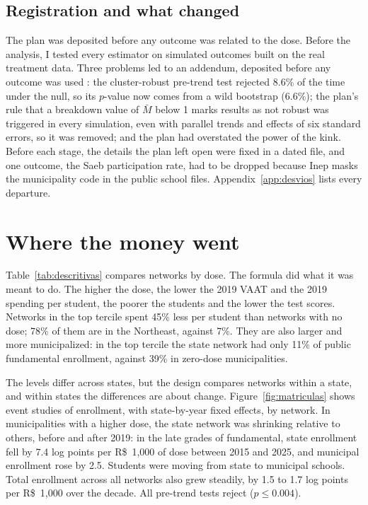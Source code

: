 \documentclass[11pt]{article}
\newcommand{\reais}{R\$}
\begin{document}
\subsection{Registration and what changed}

The plan was deposited before any outcome was related to the dose. Before the analysis, I tested every estimator on simulated outcomes built on the real treatment data. Three problems led to an addendum, deposited before any outcome was used \citep{cunha2026add}: the cluster-robust pre-trend test rejected 8.6\% of the time under the null, so its $p$-value now comes from a wild bootstrap (6.6\%); the plan's rule that a breakdown value of $\bar M$ below 1 marks results as not robust was triggered in every simulation, even with parallel trends and effects of six standard errors, so it was removed; and the plan had overstated the power of the kink. Before each stage, the details the plan left open were fixed in a dated file, and one outcome, the Saeb participation rate, had to be dropped because Inep masks the municipality code in the public school files. Appendix~\ref{app:desvios} lists every departure.

\section{Where the money went}\label{sec:onde}

Table~\ref{tab:descritivas} compares networks by dose. The formula did what it was meant to do. The higher the dose, the lower the 2019 VAAT and the 2019 spending per student, the poorer the students and the lower the test scores. Networks in the top tercile spent 45\% less per student than networks with no dose; 78\% of them are in the Northeast, against 7\%. They are also larger and more municipalized: in the top tercile the state network had only 11\% of public fundamental enrollment, against 39\% in zero-dose municipalities.

\begin{table}[t]
\centering
\caption{Networks by predicted dose}\label{tab:descritivas}
\small

\end{table}

The levels differ across states, but the design compares networks within a state, and within states the differences are about change. Figure~\ref{fig:matriculas} shows event studies of enrollment, with state-by-year fixed effects, by network. In municipalities with a higher dose, the state network was shrinking relative to others, before and after 2019: in the late grades of fundamental, state enrollment fell by 7.4 log points per \reais{}~1,000 of dose between 2015 and 2025, and municipal enrollment rose by 2.5. Students were moving from state to municipal schools. Total enrollment across all networks also grew steadily, by 1.5 to 1.7 log points per \reais{}~1,000 over the decade. All pre-trend tests reject ($p \le 0.004$).
\end{document}
